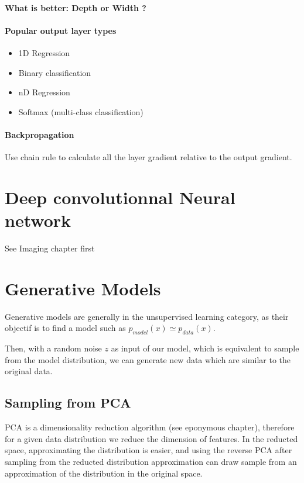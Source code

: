 		\paragraph*{What is better: Depth or Width ?}

		\paragraph*{Popular output layer types}
			\begin{itemize}
				\item 1D Regression
				\item Binary classification
				\item nD Regression
				\item Softmax (multi-class classification)
			\end{itemize}

		\paragraph*{Backpropagation}
			Use chain rule to calculate all the layer gradient relative to the output gradient.


\section{Deep convolutionnal Neural network}

	See Imaging chapter first

\section{Generative Models}

	Generative models are generally in the unsupervised learning category, as their objectif is to find a model such as $p_{model}(x) \simeq p_{data}(x)$.

	Then, with a random noise $z$ as input of our model, which is equivalent to sample from the model distribution, we can generate new data which are similar to the original data. 
	
	\subsection{Sampling from PCA}
		PCA is a dimensionality reduction algorithm (see eponymous chapter), therefore for a given data distribution we reduce the dimension of features. In the reducted space, approximating the distribution is easier, and using the reverse PCA after sampling from the reducted distribution approximation can draw sample from an approximation of the distribution in the original space. 




